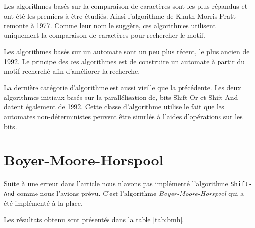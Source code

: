 \documentclass[a4paper,11pt]{article}
\begin{document}
Les algorithmes basés sur la comparaison de caractères sont les plus répandus et ont été les premiers à être étudiés. Ainsi l'algorithme de Knuth-Morris-Pratt remonte à 1977. Comme leur nom le suggère, ces algorithmes utilisent uniquement la comparaison de caractères pour rechercher le motif.

Les algorithmes basés sur un automate sont un peu plus récent, le plus ancien de 1992. Le principe des ces algorithmes est de construire un automate à partir du motif recherché afin d'améliorer la recherche.

La dernière catégorie d'algorithme est aussi vieille que la précédente. Les deux algorithmes initiaux basés sur la parallélisation de, bits Shift-Or et Shift-And datent également de 1992. Cette classe d'algorithme utilise le fait que les automates non-déterministes peuvent être simulés à l'aides d'opérations sur les bits.

\section{Boyer-Moore-Horspool}

Suite à une erreur dans l'article\cite{DBLP:journals/corr/abs-1012-2547} nous n'avons pas implémenté l'algorithme \texttt{Shift-And} comme nous l'avions prévu. C'est l'algorithme \emph{Boyer-Moore-Horspool}\cite{Baeza-Yates:1992:ART:135853.135859} qui a été implémenté à la place.

Les résultats obtenu sont présentés dans la table \ref{tab:bmh}.
\end{document}

